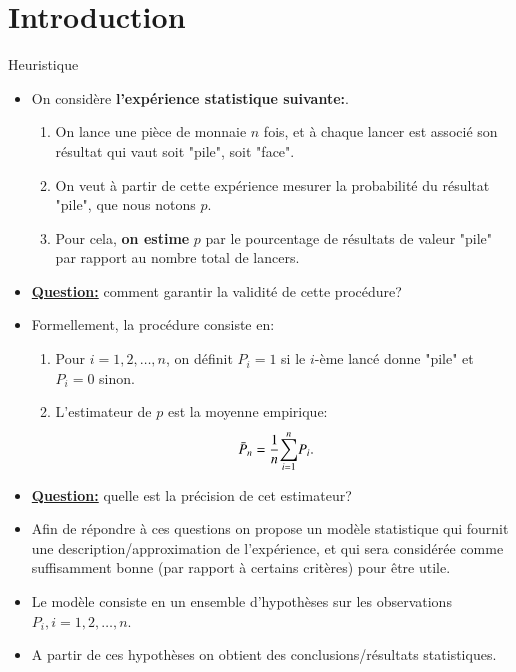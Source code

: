 \section{Introduction}
\frame{\sectionpage}

\begin{frame}[allowframebreaks]{Heuristique}
\begin{itemize}
    \item On considère \textbf{l'expérience statistique suivante:}.
    \begin{enumerate}[-]
        \item On lance une pièce de monnaie $n$ fois, et à chaque lancer est associé 
    son résultat qui vaut soit "pile", soit "face".
        \item On veut à partir de cette expérience mesurer la probabilité du résultat "pile", que nous notons $p$.
        \item Pour cela, \textbf{on estime} $p$ par le pourcentage de résultats de valeur "pile" par rapport au nombre total de lancers.
     \end{enumerate}
    \item \textbf{\underline{Question:}} comment garantir la validité de cette procédure?

\framebreak

    \item Formellement, la procédure consiste en:
    \begin{enumerate}[-]
    \item Pour $i=1, 2, \ldots, n$, on définit $P_i = 1$ si le $i$-ème lancé donne "pile" et $P_i=0$ sinon.
    \item L'estimateur de $p$ est la moyenne empirique:
    \begin{align*}
        \bar{P}_n &=\frac{1}{n}{\sum_{i=1}^n} P_i.
    \end{align*}
    \end{enumerate}
    \item \textbf{\underline{Question:}} quelle est la précision de cet estimateur?
    \item Afin de répondre à ces questions on propose un modèle statistique qui fournit une description/approximation de l'expérience, et qui sera considérée comme suffisamment bonne
    (par rapport à certains critères) pour être utile.
    \framebreak

    \item Le modèle consiste en un ensemble  d'hypothèses sur les 
     observations $P_i, i=1, 2, \ldots, n$.
     \item  A partir de ces hypothèses on obtient des conclusions/résultats statistiques.


\end{itemize}
\end{frame}
